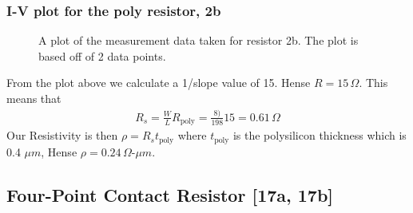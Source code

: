 \documentclass{article}
\begin{document}
\subsubsection{I-V plot for the poly resistor, 2b}
\begin{figure}[H]
\centering
{}
\caption{A plot of the measurement data taken for resistor 2b. The plot is based off of 2 data points.}
\end{figure}

From the plot above we calculate a 1/slope value of 15. Hense $R = 15 \,\Omega$. This means that 
\begin{align*}
R_s = \frac{W}{L}R_{\text{poly}} = \frac{8)}{198}15 = 0.61 \,\Omega 
\end{align*}
Our Resistivity is then $\rho = R_s t_{\text{poly}}$ where $t_{\text{poly}}$ is the polysilicon thickness which is 0.4 $\mu m$, Hense $\rho = 0.24 \,\Omega$-$\mu m$.

\subsection{Four-Point Contact Resistor [17a, 17b]} %
\end{document}
